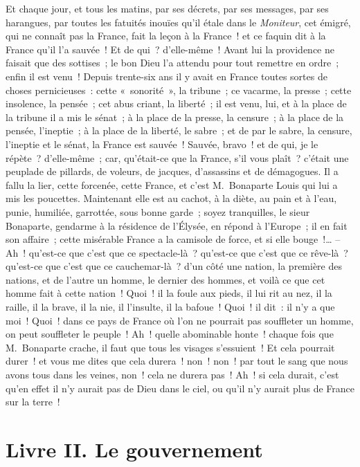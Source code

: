 \documentclass[french,twoside]{book} %
\begin{document}
Et chaque jour, et tous les matins, par ses décrets, par ses messages, par ses harangues, par toutes les fatuités inouïes qu’il étale dans le \emph{Moniteur}, cet émigré, qui ne connaît pas la France, fait la leçon à la France ! et ce faquin dit à la France qu’il l’a sauvée ! Et de qui ? d’elle-même ! Avant lui la providence ne faisait que des sottises ; le bon Dieu l’a attendu pour tout remettre en ordre ; enfin il est venu ! Depuis trente-six ans il y avait en France toutes sortes de choses pernicieuses : cette « sonorité », la tribune ; ce vacarme, la presse ; cette insolence, la pensée ; cet abus criant, la liberté ; il est venu, lui, et à la place de la tribune il a mis le sénat ; à la place de la presse, la censure ; à la place de la pensée, l’ineptie ; à la place de la liberté, le sabre ; et de par le sabre, la censure, l’ineptie et le sénat, la France est sauvée ! Sauvée, bravo ! et de qui, je le répète ? d’elle-même ; car, qu’était-ce que la France, s’il vous plaît ? c’était une peuplade de pillards, de voleurs, de jacques, d’assassins et de démagogues. Il a fallu la lier, cette forcenée, cette France, et c’est M. Bonaparte Louis qui lui a mis les poucettes. Maintenant elle est au cachot, à la diète, au pain et à l’eau, punie, humiliée, garrottée, sous bonne garde ; soyez tranquilles, le sieur Bonaparte, gendarme à la résidence de l’Élysée, en répond à l’Europe ; il en fait son affaire ; cette misérable France a la camisole de force, et si elle bouge !… – Ah ! qu’est-ce que c’est que ce spectacle-là ? qu’est-ce que c’est que ce rêve-là ? qu’est-ce que c’est que ce cauchemar-là ? d’un côté une nation, la première des nations, et de l’autre un homme, le dernier des hommes, et voilà ce que cet homme fait à cette nation ! Quoi ! il la foule aux pieds, il lui rit au nez, il la raille, il la brave, il la nie, il l’insulte, il la bafoue ! Quoi ! il dit : il n’y a que moi ! Quoi ! dans ce pays de France où l’on ne pourrait pas souffleter un homme, on peut souffleter le peuple ! Ah ! quelle abominable honte ! chaque fois que M. Bonaparte crache, il faut que tous les visages s’essuient ! Et cela pourrait durer ! et vous me dites que cela durera ! non ! non ! par tout le sang que nous avons tous dans les veines, non ! cela ne durera pas ! Ah ! si cela durait, c’est qu’en effet il n’y aurait pas de Dieu dans le ciel, ou qu’il n’y aurait plus de France sur la terre !
\section[{Livre II. Le gouvernement}]{Livre II. Le gouvernement}\renewcommand{\leftmark}{Livre II. Le gouvernement}
\end{document}
